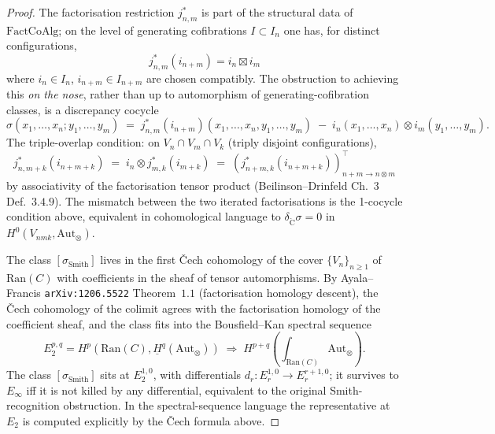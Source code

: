\documentclass[11pt]{amsart}
\newcommand{\Ran}{\mathrm{Ran}}
\newcommand{\FactCoAlg}{\mathrm{FactCoAlg}}
\newcommand{\Aut}{\mathrm{Aut}}
\newcommand{\Cech}{\check{\mathrm{C}}}
\begin{document}
\begin{proof}
The factorisation restriction $j^*_{n,m}$ is part of the structural
data of $\FactCoAlg$; on the level of generating cofibrations
$I \subset I_n$ one has, for distinct configurations,
\[
j^*_{n,m}(i_{n+m}) = i_n \boxtimes i_m
\]
where $i_n \in I_n$, $i_{n+m} \in I_{n+m}$ are chosen compatibly. The
obstruction to achieving this \emph{on the nose}, rather than up to
automorphism of generating-cofibration classes, is a discrepancy
cocycle
\[
\sigma(x_1, \dots, x_n; y_1, \dots, y_m) \;=\;
j^*_{n,m}(i_{n+m})(x_1, \dots, x_n, y_1, \dots, y_m)
\;-\; i_n(x_1, \dots, x_n) \otimes i_m(y_1, \dots, y_m).
\]
The triple-overlap condition: on $V_n \cap V_m \cap V_k$ (triply
disjoint configurations),
\[
j^*_{n, m+k}(i_{n+m+k}) \;=\; i_n \otimes j^*_{m,k}(i_{m+k})
\;=\; (j^*_{n+m, k}(i_{n+m+k}))^\top_{n+m \to n \otimes m}
\]
by associativity of the factorisation tensor product (Beilinson--Drinfeld
Ch.~3 Def.~$3.4.9$). The mismatch between the two iterated
factorisations is the 1-cocycle condition above, equivalent in
cohomological language to $\delta_{\Cech} \sigma = 0$ in
$H^0(V_{nmk}, \Aut_\otimes)$.

The class $[\sigma_{\mathrm{Smith}}]$ lives in the first
\v{C}ech cohomology of the cover $\{V_n\}_{n \geq 1}$ of $\Ran(C)$ with
coefficients in the sheaf of tensor automorphisms. By Ayala--Francis
\texttt{arXiv:1206.5522} Theorem~$1.1$ (factorisation homology descent),
the \v{C}ech cohomology of the colimit agrees with the factorisation
homology of the coefficient sheaf, and the class fits into the
Bousfield--Kan spectral sequence
\[
E_2^{p,q} = H^p(\Ran(C), \underline{H}^q(\Aut_\otimes))
\;\Rightarrow\;
H^{p+q}(\int_{\Ran(C)} \Aut_\otimes).
\]
The class $[\sigma_{\mathrm{Smith}}]$ sits at $E_2^{1, 0}$, with
differentials $d_r : E_r^{1,0} \to E_r^{r+1, 0}$; it survives to
$E_\infty$ iff it is not killed by any differential, equivalent to
the original Smith-recognition obstruction. In the spectral-sequence
language the representative at $E_2$ is computed explicitly by the
\v{C}ech formula above.
\end{proof}
\end{document}
